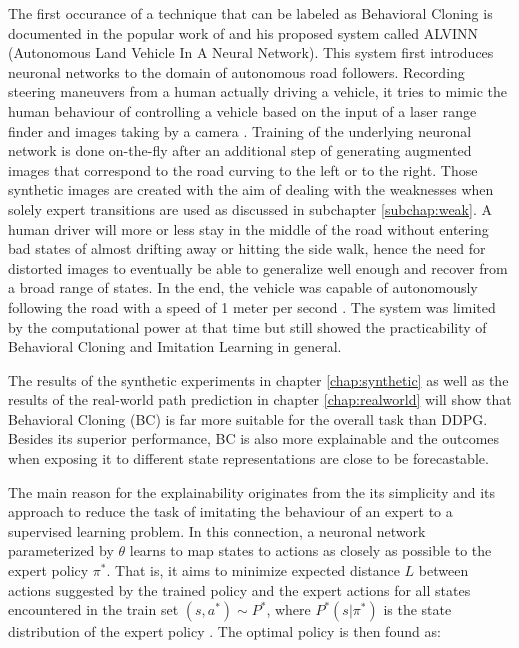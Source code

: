 The first occurance of a technique that can be labeled as Behavioral Cloning is documented in the popular work of \cite{alvinn} and his proposed system called ALVINN (Autonomous Land
Vehicle In A Neural Network). This system first introduces neuronal networks to the domain of autonomous road followers. Recording steering maneuvers from a human actually driving a vehicle, it tries to mimic the human behaviour of controlling a vehicle based on the input of a laser range finder and images taking by a camera \cite[p.~2]{alvinn}. Training of the underlying neuronal network is done on-the-fly after an additional step of generating augmented images that correspond to the road curving to the left or to the right. Those synthetic images are created with the aim of dealing with the weaknesses when solely expert transitions are used as discussed in subchapter \ref{subchap:weak}. A human driver will more or less stay in the middle of the road without entering bad states of almost drifting away or hitting the side walk, hence the need for distorted images to eventually be able to generalize well enough and recover from a broad range of states. In the end, the vehicle was capable of autonomously following the road with a speed of 1 meter per second \cite[p.~7]{alvinn}. The system was limited by the computational power at that time but still showed the practicability of Behavioral Cloning and Imitation Learning in general.
\par
The results of the synthetic experiments in chapter \ref{chap:synthetic} as well as the results of the real-world path prediction in chapter \ref{chap:realworld} will show that Behavioral Cloning (BC) is far more suitable for the overall task than DDPG. Besides its superior performance, BC is also more explainable and the outcomes when exposing it to different state representations are close to be forecastable. 
\par
The main reason for the explainability originates from the its simplicity and its approach to reduce the task of imitating the behaviour of an expert to a supervised learning problem. In this connection, a neuronal network parameterized by $\theta$ learns to map states to actions as closely as possible to the expert policy $\pi^*$. That is, it aims to minimize expected distance $L$ between actions suggested by the trained policy and the expert actions for all states encountered in the train set $(s, a^*) \sim P^*$, where $P^*(s|\pi^*)$ is the state distribution of the expert policy \cite[]{le2022survey}. The optimal policy is then found as:

